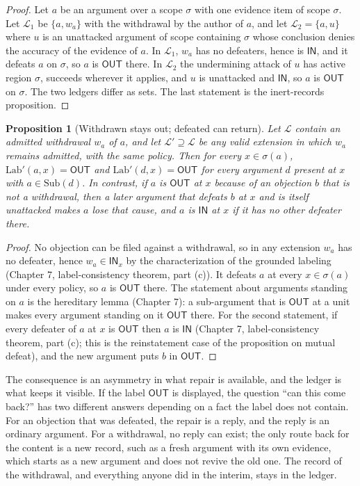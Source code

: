 \documentclass[11pt]{article}
\theoremstyle{plain}
\newtheorem{proposition}{Proposition}
\theoremstyle{definition}
\theoremstyle{remark}
\newcommand{\IN}{\textsf{IN}}
\newcommand{\OUT}{\textsf{OUT}}
\newcommand{\Lab}{\mathrm{Lab}}
\newcommand{\ledger}{\mathcal{L}}
\begin{document}
\begin{proof}
Let $a$ be an argument over a scope $\sigma$ with one evidence item of scope $\sigma$. Let $\ledger_1$ be $\{a,w_a\}$ with the withdrawal by the author of $a$, and let $\ledger_2=\{a,u\}$ where $u$ is an unattacked argument of scope containing $\sigma$ whose conclusion denies the accuracy of the evidence of $a$. In $\ledger_1$, $w_a$ has no defeaters, hence is $\IN$, and it defeats $a$ on $\sigma$, so $a$ is $\OUT$ there. In $\ledger_2$ the undermining attack of $u$ has active region $\sigma$, succeeds wherever it applies, and $u$ is unattacked and $\IN$, so $a$ is $\OUT$ on $\sigma$. The two ledgers differ as sets. The last statement is the inert-records proposition.
\end{proof}

\begin{proposition}[Withdrawn stays out; defeated can return]\label{prop:stay}
Let $\ledger$ contain an admitted withdrawal $w_a$ of $a$, and let $\ledger'\supseteq\ledger$ be any valid extension in which $w_a$ remains admitted, with the same policy. Then for every $x\in\sigma(a)$, $\Lab'(a,x)=\OUT$ and $\Lab'(d,x)=\OUT$ for every argument $d$ present at $x$ with $a\in\mathrm{Sub}(d)$. In contrast, if $a$ is $\OUT$ at $x$ because of an objection $b$ that is not a withdrawal, then a later argument that defeats $b$ at $x$ and is itself unattacked makes $a$ lose that cause, and $a$ is $\IN$ at $x$ if it has no other defeater there.
\end{proposition}

\begin{proof}
No objection can be filed against a withdrawal, so in any extension $w_a$ has no defeater, hence $w_a\in\IN_x$ by the characterization of the grounded labeling (Chapter 7, label-consistency theorem, part (c)). It defeats $a$ at every $x\in\sigma(a)$ under every policy, so $a$ is $\OUT$ there. The statement about arguments standing on $a$ is the hereditary lemma (Chapter 7): a sub-argument that is $\OUT$ at a unit makes every argument standing on it $\OUT$ there. For the second statement, if every defeater of $a$ at $x$ is $\OUT$ then $a$ is $\IN$ (Chapter 7, label-consistency theorem, part (c); this is the reinstatement case of the proposition on mutual defeat), and the new argument puts $b$ in $\OUT$.
\end{proof}

The consequence is an asymmetry in what repair is available, and the ledger is what keeps it visible. If the label $\OUT$ is displayed, the question ``can this come back?'' has two different answers depending on a fact the label does not contain. For an objection that was defeated, the repair is a reply, and the reply is an ordinary argument. For a withdrawal, no reply can exist; the only route back for the content is a new record, such as a fresh argument with its own evidence, which starts as a new argument and does not revive the old one. The record of the withdrawal, and everything anyone did in the interim, stays in the ledger.
\end{document}
